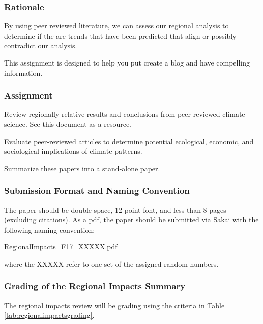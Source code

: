 
\subsubsection{Rationale}

By using peer reviewed literature, we can assess our regional analysis to determine if the are trends that have been predicted that align or possibly contradict our analysis. 

This assignment is designed to help you put create a blog and have compelling information. 

\subsubsection{Assignment}

Review regionally relative results and conclusions from peer reviewed climate science. See this document as a resource.

Evaluate peer-reviewed articles to determine potential ecological, economic, and sociological implications of climate patterns.

Summarize these papers into a stand-alone paper. 

\subsubsection{Submission Format and Naming Convention}

The paper should be double-space, 12 point font, and less than 8 pages (excluding citations). As a pdf, the paper should be submitted via Sakai with the following naming convention:

\medskip
RegionalImpacts\_F17\_XXXXX.pdf

\medskip \noindent where the XXXXX refer to one set of the assigned random numbers. 

\subsubsection{Grading of the Regional Impacts Summary}

The regional impacts review will be grading using the criteria in Table \ref{tab:regionalimpactsgrading}.

